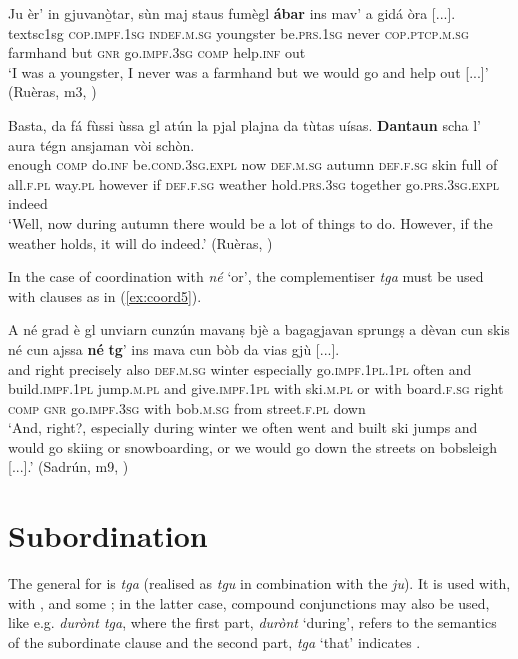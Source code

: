 \ea
\label{ex:coord3}
\gll Ju èr’ in gjuvanò̱tar, sùn maj staus fumègl \textbf{ábar} ins mav’ a gidá òra [...].\\
textsc{1sg} \textsc{cop.impf.1sg} \textsc{indef.m.sg} youngster be.\textsc{prs.1sg} never \textsc{cop.ptcp.m.sg} farmhand but \textsc{gnr} go.\textsc{impf.3sg} \textsc{comp} help.\textsc{inf} out \\
\glt `I was a youngster, I never was a farmhand but we would go and help out [...]' (Ruèras, m3, )
\z

\ea
\label{ex:coord4}
\gll Basta, da fá fùssi ùssa gl atún la pjal plajna da tùtas uísas. \textbf{Dantaun} scha l' aura tégn ansjaman vòi schòn.\\
enough \textsc{comp} do.\textsc{inf} be.\textsc{cond.3sg.expl} now \textsc{def.m.sg} autumn \textsc{def.f.sg} skin full of all.\textsc{f.pl} way.\textsc{pl} however if \textsc{def.f.sg} weather hold.\textsc{prs.3sg} together go.\textsc{prs.3sg.expl} indeed\\
\glt `Well, now during autumn there would be a lot of things to do. However, if the weather holds, it will do indeed.' (Ruèras, )
\z

In the case of coordination with \textit{né} `or', the complementiser \textit{tga} must be used with clauses as in (\ref{ex:coord5}).

\ea
\label{ex:coord5}
\gll A né grad è gl unviarn cunzún mavanṣ bjè a bagagjavan sprungṣ a dèvan cun skis né cun ajssa \textbf{né} \textbf{tg}’ ins mava cun bòb da vias gjù [...].\\
and right precisely also \textsc{def.m.sg} winter especially go.\textsc{impf.1pl.1pl} often and build.\textsc{impf.1pl} jump.\textsc{m.pl} and give.\textsc{impf.1pl} with ski.\textsc{m.pl} or with board.\textsc{f.sg} right \textsc{comp} \textsc{gnr} go.\textsc{impf.3sg} with bob.\textsc{m.sg} from street.\textsc{f.pl} down\\
\glt `And, right?, especially during winter we often went and built ski jumps and would go skiing or snowboarding, or we would go down the streets on bobsleigh [...].' (Sadrún, m9, )
\z


\section{Subordination}\label{sec:6.2}
The general  for  is \textit{tga} (realised as \textit{tgu} in combination with the  \textit{ju}). It is used with, with , and some ; in the latter case, compound conjunctions may also be used, like e.g.  \textit{durònt tga}, where the first part, \textit{durònt} `during', refers to the semantics of the subordinate clause and the second part, \textit{tga} `that' indicates .

